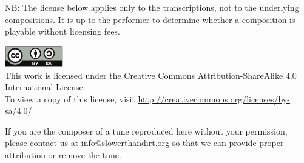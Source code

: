 \begin{titlepage}
\begin{center}
\begin{minipage}{6in}
NB: The license below applies only to the transcriptions, not to the
underlying compositions. It is up to the performer to determine
whether a composition is playable without licensing fees.


\end{minipage}

\vfill


\includegraphics[width=1in]{../includes/cc-by-sa}\\
This work is licensed under the Creative Commons
Attribution-ShareAlike 4.0 International License.\\
To view a copy of this license, visit 
\url{http://creativecommons.org/licenses/by-sa/4.0/}

\end{center}
\end{titlepage}

\clearpage



\vfill

\noindent
If you are the composer of a tune reproduced here without your permission,
please contact us at info@slowerthandirt.org so that we can provide proper
attribution or remove the tune.

\cleardoublepage
